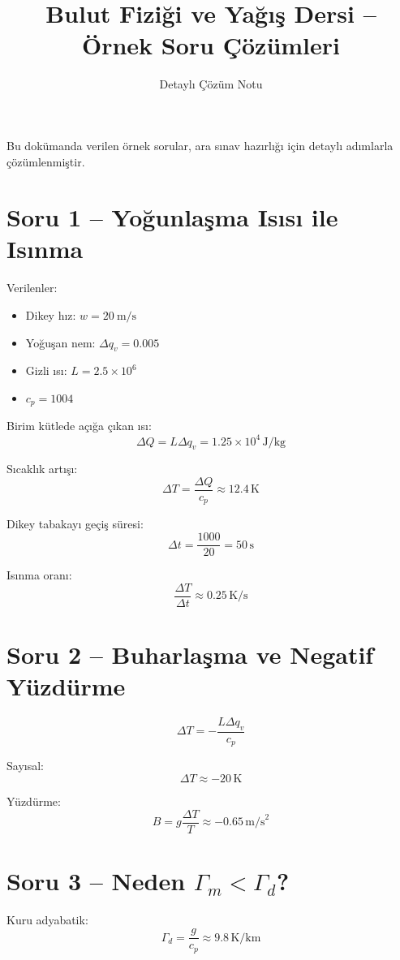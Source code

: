 \documentclass[12pt,a4paper]{article}
\title{Bulut Fiziği ve Yağış Dersi -- Örnek Soru Çözümleri}
\author{Detaylı Çözüm Notu}
\date{}
\begin{document}
\maketitle

Bu dokümanda verilen örnek sorular, ara sınav hazırlığı için detaylı adımlarla çözümlenmiştir.

\section*{Soru 1 -- Yoğunlaşma Isısı ile Isınma}

Verilenler:
\begin{itemize}
  \item Dikey hız: \(w = \SI{20}{\meter\per\second}\)
  \item Yoğuşan nem: \(\Delta q_v = 0.005\)
  \item Gizli ısı: \(L = 2.5 \times 10^6\)
  \item \(c_p = 1004\)
\end{itemize}

Birim kütlede açığa çıkan ısı:
\[
\Delta Q = L \Delta q_v = 1.25\times 10^4 \, \text{J/kg}
\]

Sıcaklık artışı:
\[
\Delta T = \frac{\Delta Q}{c_p} \approx 12.4 \, \text{K}
\]

Dikey tabakayı geçiş süresi:
\[
\Delta t = \frac{1000}{20} = 50 \, \text{s}
\]

Isınma oranı:
\[
\frac{\Delta T}{\Delta t} \approx 0.25 \,\text{K/s}
\]

\section*{Soru 2 -- Buharlaşma ve Negatif Yüzdürme}

\[
\Delta T = -\frac{L \Delta q_v}{c_p}
\]

Sayısal:
\[
\Delta T \approx -20 \, \text{K}
\]

Yüzdürme:
\[
B = g \frac{\Delta T}{T} \approx -0.65\, \text{m/s}^2
\]

\section*{Soru 3 -- Neden \(\Gamma_m < \Gamma_d\)?}

Kuru adyabatik:
\[
\Gamma_d = \frac{g}{c_p} \approx 9.8 \, \text{K/km}
\]
\end{document}
